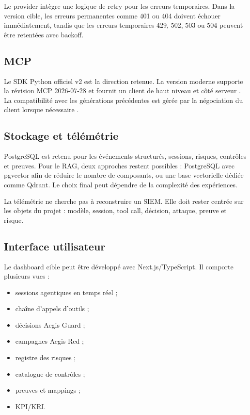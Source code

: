 Le provider intègre une logique de retry pour les erreurs temporaires. Dans la version cible, les erreurs permanentes comme 401 ou 404 doivent échouer immédiatement, tandis que les erreurs temporaires 429, 502, 503 ou 504 peuvent être retentées avec backoff.

\subsection{MCP}

Le SDK Python officiel v2 est la direction retenue. La version moderne supporte la révision MCP 2026-07-28 et fournit un client de haut niveau et  côté serveur \cite{mcppythonv2}. La compatibilité avec les générations précédentes est gérée par la négociation du client lorsque nécessaire \cite{mcpprotocolversions}.

\subsection{Stockage et télémétrie}

PostgreSQL est retenu pour les événements structurés, sessions, risques, contrôles et preuves. Pour le RAG, deux approches restent possibles : PostgreSQL avec pgvector afin de réduire le nombre de composants, ou une base vectorielle dédiée comme Qdrant. Le choix final peut dépendre de la complexité des expériences.

La télémétrie ne cherche pas à reconstruire un SIEM. Elle doit rester centrée sur les objets du projet : modèle, session, tool call, décision, attaque, preuve et risque.

\subsection{Interface utilisateur}

Le dashboard cible peut être développé avec Next.js/TypeScript. Il comporte plusieurs vues :

\begin{itemize}
    \item sessions agentiques en temps réel ;
    \item chaîne d'appels d'outils ;
    \item décisions Aegis Guard ;
    \item campagnes Aegis Red ;
    \item registre des risques ;
    \item catalogue de contrôles ;
    \item preuves et mappings ;
    \item KPI/KRI.
\end{itemize}

